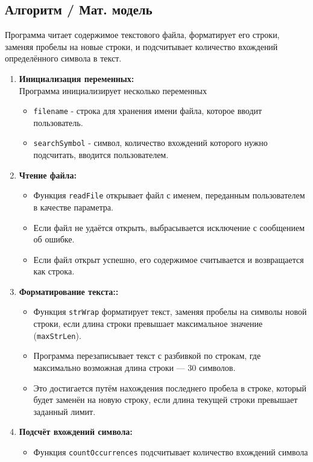 \documentclass[14pt,a4paper]{article}
\begin{document}
\subsection{Алгоритм / Мат. модель}
Программа читает содержимое текстового файла, форматирует его строки, заменяя
пробелы на новые строки, и подсчитывает количество вхождений определённого
символа в текст.
\begin{enumerate}
  \item \textbf{Инициализация переменных:}\\
    Программа инициализирует несколько переменных
    \begin{itemize}
      \item \texttt{filename} - строка для хранения имени файла, которое вводит
        пользователь.
      \item \texttt{searchSymbol} - символ, количество вхождений которого нужно
        подсчитать, вводится пользователем.
    \end{itemize}
  \item \textbf{Чтение файла:}
    \begin{itemize}
      \item Функция \texttt{readFile} открывает файл с именем, переданным
        пользователем в качестве параметра.
      \item Если файл не удаётся открыть, выбрасывается исключение с сообщением
        об ошибке.
      \item Если файл открыт успешно, его содержимое считывается и возвращается
        как строка.
    \end{itemize}
  \item \textbf{Форматирование текста::}
    \begin{itemize}
      \item Функция \texttt{strWrap} форматирует текст, заменяя пробелы на символы новой
        строки, если длина строки превышает максимальное значение (\texttt{maxStrLen}).
      \item Программа перезаписывает текст с разбивкой по строкам, где
        максимально возможная длина строки — 30 символов.
      \item Это достигается путём нахождения последнего пробела в строке,
        который будет заменён на новую строку, если длина текущей строки
        превышает заданный лимит.
    \end{itemize}
  \item \textbf{Подсчёт вхождений символа:}
    \begin{itemize}
      \item Функция \texttt{countOccurrences} подсчитывает количество вхождений символа

\end{itemize}
\end{enumerate}
\end{document}
